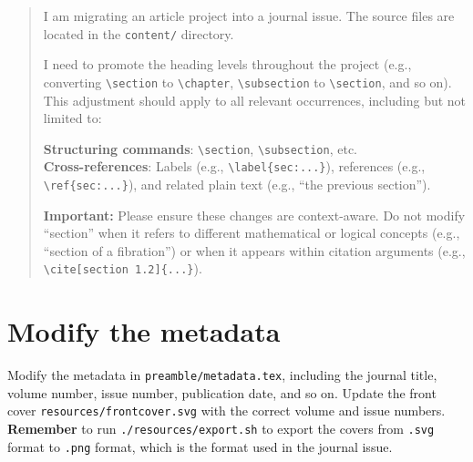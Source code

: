 \begin{quotation}
  \vspace{-3em}
  \setlength{\parskip}{0.5em}
  \setlength{\parindent}{0em}
  \small\noindent

  I am migrating an article project into a journal issue. The source files are located in the \texttt{content/} directory. 

  I need to promote the heading levels throughout the project (e.g., converting \verb|\section| to \verb|\chapter|, \verb|\subsection| to \verb|\section|, and so on). This adjustment should apply to all relevant occurrences, including but not limited to:

  \textbf{Structuring commands}: \verb|\section|, \verb|\subsection|, etc. \\  
  \textbf{Cross-references}: Labels (e.g., \verb|\label{sec:...}|), references (e.g., \verb|\ref{sec:...}|), and related plain text (e.g., ``the previous section'').

  \textbf{Important:} Please ensure these changes are context-aware. Do not modify ``section'' when it refers to different mathematical or logical concepts (e.g., ``section of a fibration'') or when it appears within citation arguments (e.g., \verb|\cite[section 1.2]{...}|).
\end{quotation}

\section{Modify the metadata}

Modify the metadata in \texttt{preamble/metadata.tex}, including the journal title, volume number, issue number, publication date, and so on.
Update the front cover \texttt{resources/frontcover.svg} with the correct volume and issue numbers.
\textbf{Remember} to run \verb|./resources/export.sh| to export the covers from \verb|.svg| format to \verb|.png| format, which is the format used in the journal issue.

